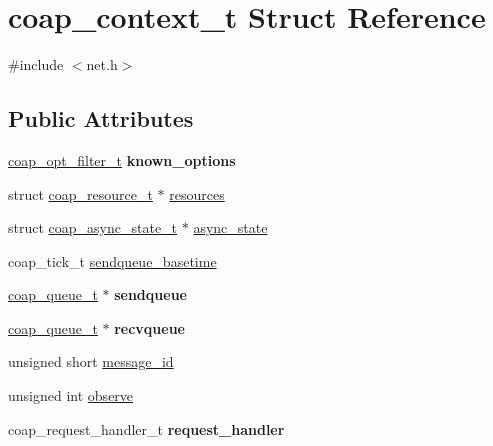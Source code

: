 \hypertarget{structcoap__context__t}{}\section{coap\+\_\+context\+\_\+t Struct Reference}
\label{structcoap__context__t}


{\ttfamily \#include $<$net.\+h$>$}

\subsection*{Public Attributes}
\begin{DoxyCompactItemize}
\item 
\hypertarget{structcoap__context__t_a907e852e962a4ecafc3706c6b0d2e2d2}{}\hyperlink{group__opt__filter_gace614f18a4f0133a72096094c11c3b19}{coap\+\_\+opt\+\_\+filter\+\_\+t} {\bfseries known\+\_\+options}\label{structcoap__context__t_a907e852e962a4ecafc3706c6b0d2e2d2}

\item 
struct \hyperlink{structcoap__resource__t}{coap\+\_\+resource\+\_\+t} $\ast$ \hyperlink{structcoap__context__t_aaf441070f9b1f2aea225fc61b60a6bb8}{resources}
\item 
struct \hyperlink{structcoap__async__state__t}{coap\+\_\+async\+\_\+state\+\_\+t} $\ast$ \hyperlink{structcoap__context__t_a4f287951eac36a9488fd9524eb1cbdb8}{async\+\_\+state}
\item 
coap\+\_\+tick\+\_\+t \hyperlink{structcoap__context__t_a080dc026c9eec48849d0140b433e04bb}{sendqueue\+\_\+basetime}
\item 
\hypertarget{structcoap__context__t_aa1e842d6431edb653dcfb117c237657f}{}\hyperlink{structcoap__queue__t}{coap\+\_\+queue\+\_\+t} $\ast$ {\bfseries sendqueue}\label{structcoap__context__t_aa1e842d6431edb653dcfb117c237657f}

\item 
\hypertarget{structcoap__context__t_a6230687bf6b5bd5c214bbfb908ff6fa5}{}\hyperlink{structcoap__queue__t}{coap\+\_\+queue\+\_\+t} $\ast$ {\bfseries recvqueue}\label{structcoap__context__t_a6230687bf6b5bd5c214bbfb908ff6fa5}

\item 
unsigned short \hyperlink{structcoap__context__t_a394ef9edc0510b05ddc7aeaa48110fcd}{message\+\_\+id}
\item 
unsigned int \hyperlink{structcoap__context__t_a0c362c57200374b1e7d2331ec3994485}{observe}
\item 
\hypertarget{structcoap__context__t_a3a1b2f824e50901b8c11543f263a651a}{}coap\+\_\+request\+\_\+handler\+\_\+t {\bfseries request\+\_\+handler}\label{structcoap__context__t_a3a1b2f824e50901b8c11543f263a651a}


\end{DoxyCompactItemize}
